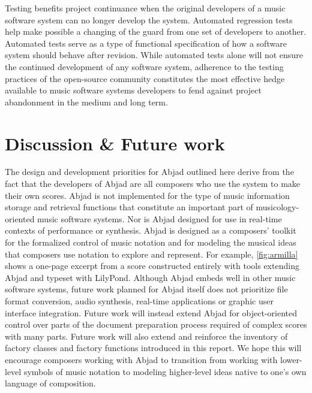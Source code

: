 \documentclass{article}
\begin{document}
Testing benefits project continuance when the original developers of a music
software system can no longer develop the system. Automated regression tests
help make possible a changing of the guard from one set of developers to
another. Automated tests serve as a type of functional specification of how a
software system should behave after revision. While automated tests alone will
not ensure the continued development of any software system, adherence to the
testing practices of the open-source community constitutes the most effective
hedge available to music software systems developers to fend against project
abandonment in the medium and long term.

\section{Discussion \& Future work} \label{sec:discussion}

The design and development priorities for Abjad outlined here derive from the
fact that the developers of Abjad are all composers who use the system to make
their own scores. Abjad is not implemented for the type of music information
storage and retrieval functions that constitute an important part of
musicology-oriented music software systems. Nor is Abjad designed for use in
real-time contexts of performance or synthesis. Abjad is designed as a
composers' toolkit for the formalized control of music notation and for
modeling the musical ideas that composers use notation to explore and
represent. For example, \cref{fig:armilla} shows a one-page excerpt from a
score constructed entirely with tools extending Abjad and typeset with
LilyPond. Although Abjad embeds well in other music software systems, future
work planned for Abjad itself does not prioritize file format conversion, audio
synthesis, real-time applications or graphic user interface integration. Future
work will instead extend Abjad for object-oriented control over parts of the
document preparation process required of complex scores with many parts. Future
work will also extend and reinforce the inventory of factory classes and
factory functions introduced in this report. We hope this will encourage
composers working with Abjad to transition from working with lower-level
symbols of music notation to modeling higher-level ideas native to one's own
language of composition.

\end{document}
